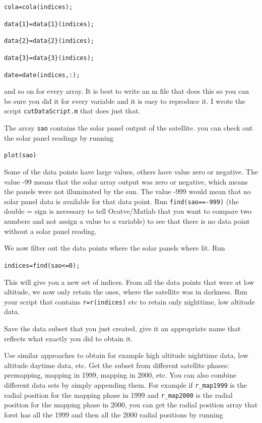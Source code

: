 \documentclass[11pt]{article}
\begin{document}
\qquad \verb+cola=cola(indices);+

\qquad \verb+data{1}=data{1}(indices);+

\qquad \verb+data{2}=data{2}(indices);+

\qquad \verb+data{3}=data{3}(indices);+

\qquad \verb+date=date(indices,:);+

and so on for every array. It is best to write an m file that does this so you can be sure you did it for every variable and it is easy to reproduce it. I wrote the script \verb+cutDataScript.m+ that does just that.


The array \verb+sao+ contains the solar panel output of the satellite. you can check out the solar panel readings by running

\qquad \verb+plot(sao)+

Some of the data points have large values, others have value zero or negative. The value -99 means that the solar array output was zero or negative, which means the panels were not illuminated by the sun. The value -999 would mean that no solar panel data is available for that data point. Run \verb+find(sao==-999)+ (the double = sign is necessary to tell Ocatve/Matlab that you want to compare two numbers and not assign a value to a variable) to see that there is no data point without a solar panel reading.

We now filter out the data points where the solar panels where lit. Run

\qquad \verb+indices=find(sao<=0);+

This will give you a new set of indices. From all the data points that were at low altitude, we now only retain the ones, where the satellite was in darkness. Run your script that contains \verb+r=r(indices)+ etc to retain only nighttime, low altitude data.

Save the data subset that you just created, give it an appropriate name that reflects what exactly you did to obtain it.

Use similar approaches to obtain for example high altitude nighttime data, low altitude daytime data, etc. Get the subset from different satellite phases: premapping, mapping in 1999, mapping in 2000, etc. You can also combine different data sets by simply appending them. For example if \verb+r_map1999+ is the radial position for the mapping phase in 1999 and \verb+r_map2000+ is the radial position for the mapping phase in 2000, you can get the radial position array that forst has all the 1999 and then all the 2000 radial positions by running
\end{document}

